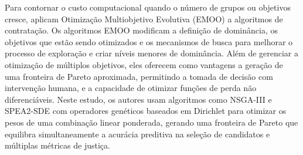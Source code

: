 Para contornar o custo computacional quando o número de grupos ou objetivos cresce,
\citet{geden2021fair} aplicam Otimização Multiobjetivo Evolutiva (EMOO) a algoritmos de contratação. Os algoritmos EMOO modificam a definição de dominância, os objetivos que estão sendo otimizados e os mecanismos de busca para melhorar o processo de exploração e criar níveis menores de dominância. Além de gerenciar a otimização de múltiplos objetivos, eles oferecem como vantagens a geração de uma fronteira de Pareto aproximada, permitindo a tomada de decisão com intervenção humana, e a capacidade de otimizar funções de perda não diferenciáveis.
Neste estudo, os autores usam algoritmos como NSGA-III e SPEA2-SDE com operadores genéticos baseados em Dirichlet para otimizar os pesos de uma combinação linear ponderada, gerando uma fronteira de Pareto que equilibra simultaneamente a acurácia preditiva na seleção de candidatos e múltiplas métricas de justiça.

